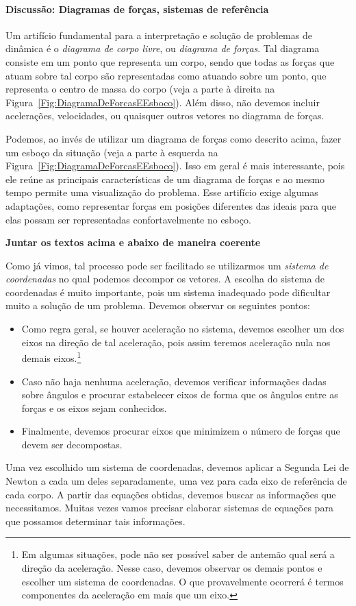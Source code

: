 \paragraph{Discussão: Diagramas de forças, sistemas de referência}

Um artifício fundamental para a interpretação e solução de problemas de dinâmica é o \emph{diagrama de corpo livre}, ou \emph{diagrama de forças}. Tal diagrama consiste em um ponto que representa um corpo, sendo que todas as forças que atuam sobre tal corpo são representadas como atuando sobre um ponto, que representa o centro de massa do corpo (veja a parte à direita na Figura~\ref{Fig:DiagramaDeForcasEEsboco}). Além disso, não devemos incluir acelerações, velocidades, ou quaisquer outros vetores no diagrama de forças.

Podemos, ao invés de utilizar um diagrama de forças como descrito acima, fazer um esboço da situação (veja a parte à esquerda na Figura~\ref{Fig:DiagramaDeForcasEEsboco}). Isso em geral é mais interessante, pois ele reúne as principais características de um diagrama de forças e ao mesmo tempo permite uma visualização do problema. Esse artifício exige algumas adaptações, como representar forças em posições diferentes das ideais para que elas possam ser representadas confortavelmente no esboço.

\textbf{Juntar os textos acima e abaixo de maneira coerente}

Como já vimos, tal processo pode ser facilitado se utilizarmos um \emph{sistema de coordenadas} no qual podemos decompor os vetores. A escolha do sistema de coordenadas é muito importante, pois um sistema inadequado pode dificultar muito a solução de um problema. Devemos observar os seguintes pontos:
\begin{itemize}
    \item Como regra geral, se houver aceleração no sistema, devemos escolher um dos eixos na direção de tal aceleração, pois assim teremos aceleração nula nos demais eixos.\footnote{Em algumas situações, pode não ser possível saber de antemão qual será a direção da aceleração. Nesse caso, devemos observar os demais pontos e escolher um sistema de coordenadas. O que provavelmente ocorrerá é termos componentes da aceleração em mais que um eixo.}
    \item Caso não haja nenhuma aceleração, devemos verificar informações dadas sobre ângulos e procurar estabelecer eixos de forma que os ângulos entre as forças e os eixos sejam conhecidos.
    \item Finalmente, devemos procurar eixos que minimizem o número de forças que devem ser decompostas.
\end{itemize}
%
Uma vez escolhido um sistema de coordenadas, devemos aplicar a Segunda Lei de Newton a cada um deles separadamente, uma vez para cada eixo de referência de cada corpo. A partir das equações obtidas, devemos buscar as informações que necessitamos. Muitas vezes vamos precisar elaborar sistemas de equações para que possamos determinar tais informações.

